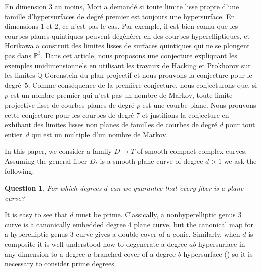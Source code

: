 \documentclass[JEP,XML,SOM,Unicode,NoFloatCountersInSection,published]{cedram}
\theoremstyle{plain}
\newtheorem*{question}{Question}
\theoremstyle{definition}
\begin{document}
\begin{altabstract}
En dimension 3 au moins, Mori a demandé si toute limite lisse propre d'une famille d'hyper\-surfaces de degré premier est toujours une hypersurface. En dimensions 1 et 2, ce n'est pas le cas. Par exemple, il est bien connu que les courbes planes quintiques peuvent dégénérer en des courbes hyperelliptiques, et Horikawa a construit des limites lisses de surfaces quintiques qui ne se plongent pas dans $\mathbb{P}^3$. Dans cet article, nous proposons une conjecture expliquant les exemples unidimensionnels en utilisant les travaux de Hacking et Prokhorov sur les limites $\mathbb{Q}$\nobreakdash-Gorenstein du plan projectif et nous prouvons la conjecture pour le degré~$5$. Comme conséquence de la première conjecture,  nous conjecturons que, si $p$ est un nombre premier qui n'est pas un nombre de Markov, toute limite projective lisse de courbes planes de degré $p$ est une courbe plane. Nous prouvons cette conjecture pour les courbes de degré 7 et justifions la conjecture en exhibant des limites lisses non planes de familles de courbes de degré $d$ pour tout entier~$d$ qui est un multiple d'un nombre de Markov.\end{altabstract}

\maketitle
\vspace*{-\baselineskip}
\tableofcontents
\mainmatter

In this paper, we consider a family $D\to T$ of smooth compact complex curves. Assuming the general fiber $D_t$ is a smooth plane curve of degree $d>1$ we ask the following:\enlargethispage{.5\baselineskip}

\begin{question}
For which degrees $d$ can we guarantee that \emph{every} fiber is a plane curve?
\end{question}

\noindent It is easy to see that $d$ must be prime. Classically, a nonhyperelliptic genus 3 curve is a canonically embedded degree 4 plane curve, but the canonical map for a hyperelliptic genus 3 curve gives a double cover of a conic. Similarly, when $d$ is composite it is well understood how to degenerate a degree $ab$ hypersurface in any dimension to a degree $a$ branched cover of a degree $b$ hypersurface (\cite[Ex.\,1.59]{KollarModuliBook}) so it is necessary to consider prime degrees.
\end{document}
